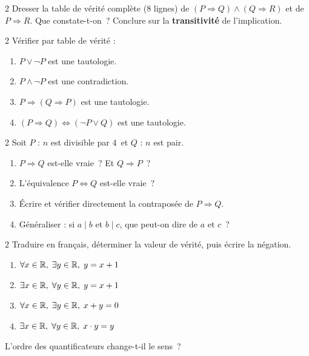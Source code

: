 \begin{exo}{2}
Dresser la table de v\'erit\'e compl\`ete ($8$ lignes) de
$(P \Rightarrow Q) \land (Q \Rightarrow R)$ et de $P \Rightarrow R$.
Que constate-t-on~? Conclure sur la \textbf{transitivit\'e} de l'implication.
\end{exo}

\begin{exo}{2}
V\'erifier par table de v\'erit\'e :
\begin{enumerate}
  \item $P \lor \lnot P$ est une tautologie.
  \item $P \land \lnot P$ est une contradiction.
  \item $P \Rightarrow (Q \Rightarrow P)$ est une tautologie.
  \item $(P \Rightarrow Q) \Leftrightarrow (\lnot P \lor Q)$ est une tautologie.
\end{enumerate}
\end{exo}

\begin{exo}{2}
Soit $P$ : \og $n$ est divisible par $4$\fg\ et
$Q$ : \og $n$ est pair\fg.
\begin{enumerate}
  \item $P \Rightarrow Q$ est-elle vraie~? Et $Q \Rightarrow P$~?
  \item L'\'equivalence $P \Leftrightarrow Q$ est-elle vraie~?
  \item \'Ecrire et v\'erifier directement la contrapos\'ee de $P \Rightarrow Q$.
  \item G\'en\'eraliser : si $a \mid b$ et $b \mid c$, que peut-on dire de $a$ et $c$~?
\end{enumerate}
\end{exo}

\begin{exo}{2}
Traduire en fran\c cais, d\'eterminer la valeur de v\'erit\'e,
puis \'ecrire la n\'egation.
\begin{enumerate}
  \item $\forall x \in \mathbb{R},\; \exists y \in \mathbb{R},\; y = x + 1$
  \item $\exists x \in \mathbb{R},\; \forall y \in \mathbb{R},\; y = x + 1$
  \item $\forall x \in \mathbb{R},\; \exists y \in \mathbb{R},\; x + y = 0$
  \item $\exists x \in \mathbb{R},\; \forall y \in \mathbb{R},\; x \cdot y = y$
\end{enumerate}
L'ordre des quantificateurs change-t-il le sens~?
\end{exo}

